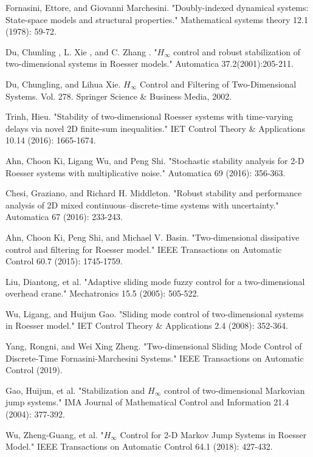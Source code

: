 \documentclass[conference]{IEEEtran}
\begin{document}
\begin{thebibliography}{1}
	Fornasini, Ettore, and Giovanni Marchesini. "Doubly-indexed dynamical systems: State-space models and structural properties." Mathematical systems theory 12.1 (1978): 59-72.
	
	Du, Chunling , L. Xie , and C. Zhang . "$H_{\infty}$ control and robust stabilization of two-dimensional systems in Roesser models." Automatica 37.2(2001):205-211.
	
	Du, Chungling, and Lihua Xie. $H_{\infty}$ Control and Filtering of Two-Dimensional Systems. Vol. 278. Springer Science \& Business Media, 2002.
	
	Trinh, Hieu. "Stability of two-dimensional Roesser systems with time-varying delays via novel 2D finite-sum inequalities." IET Control Theory \& Applications 10.14 (2016): 1665-1674.
	
	Ahn, Choon Ki, Ligang Wu, and Peng Shi. "Stochastic stability analysis for 2-D Roesser systems with multiplicative noise." Automatica 69 (2016): 356-363.
	
	Chesi, Graziano, and Richard H. Middleton. "Robust stability and performance analysis of 2D mixed continuous–discrete-time systems with uncertainty." Automatica 67 (2016): 233-243.
	
	Ahn, Choon Ki, Peng Shi, and Michael V. Basin. "Two-dimensional dissipative control and filtering for Roesser model." IEEE Transactions on Automatic Control 60.7 (2015): 1745-1759.
	
	Liu, Diantong, et al. "Adaptive sliding mode fuzzy control for a two-dimensional overhead crane." Mechatronics 15.5 (2005): 505-522.
	
	Wu, Ligang, and Huijun Gao. "Sliding mode control of two-dimensional systems in Roesser model." IET Control Theory \& Applications 2.4 (2008): 352-364.
	
	Yang, Rongni, and Wei Xing Zheng. "Two-dimensional Sliding Mode Control of Discrete-Time Fornasini-Marchesini Systems." IEEE Transactions on Automatic Control (2019).
	
	Gao, Huijun, et al. "Stabilization and $H_{\infty}$ control of two-dimensional Markovian jump systems." IMA Journal of Mathematical Control and Information 21.4 (2004): 377-392.
	
	Wu, Zheng-Guang, et al. "$H_{\infty}$ Control for 2-D Markov Jump Systems in Roesser Model." IEEE Transactions on Automatic Control 64.1 (2018): 427-432.
	

\end{thebibliography}
\end{document}
